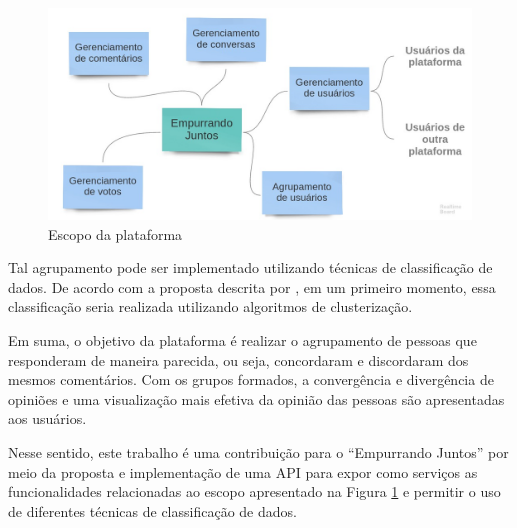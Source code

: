 \begin{figure}[h!]
\centering
\includegraphics[scale=0.35]{figuras/mapa_mental_ej.jpg}
\caption{Escopo da plataforma}
\label{fig:mapa_mental_ej}
\end{figure}


Tal agrupamento pode ser implementado utilizando técnicas de classificação de dados.
De acordo com a proposta descrita por , 
em um primeiro momento, essa classificação seria realizada utilizando algoritmos de clusterização. 

Em suma, o objetivo da plataforma é realizar o agrupamento de pessoas que responderam de maneira parecida, ou seja, 
concordaram e discordaram dos mesmos comentários. Com os grupos formados, a convergência e divergência 
de opiniões e uma visualização mais efetiva da opinião das pessoas são apresentadas aos usuários. 

Nesse sentido, este trabalho 
é uma contribuição para o ``Empurrando Juntos'' por meio da proposta e implementação de uma API para expor como serviços as funcionalidades
relacionadas ao escopo apresentado na Figura \ref{fig:mapa_mental_ej}  e permitir o uso de diferentes técnicas 
de classificação de dados.


